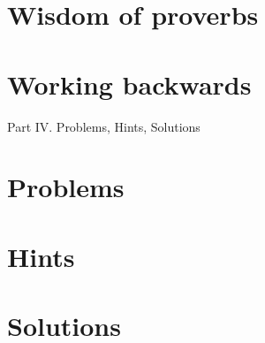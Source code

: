 \documentclass[oneside]{book}
\numberwithin{equation}{section}
\begin{document}
\section{Wisdom of proverbs}

\section{Working backwards}

\begin{center}
	\huge Part IV. Problems, Hints, Solutions
\end{center}

\section{Problems}

\section{Hints}

\section{Solutions}




\printbibliography[heading=bibintoc]
	
\end{document}
